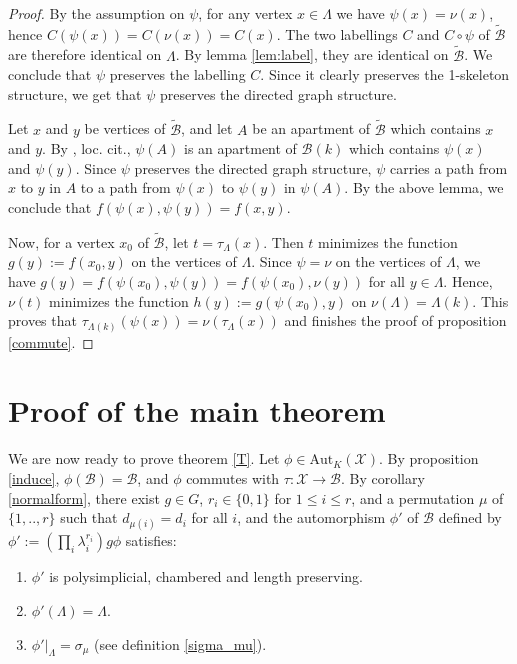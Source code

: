 \documentclass{amsart}
\theoremstyle{theorem}
\theoremstyle{lemma}
\theoremstyle{prop}
\theoremstyle{definition}
\theoremstyle{corollary}
\theoremstyle{remark}
\newcommand{\B}{\mathcal{B}}
\newcommand{\X}{\mathcal{X}}
\newcommand{\Aut}{\text{Aut}}
\begin{document}
\begin{proof}
By the assumption on $\psi$, for any vertex $x\in \Lambda$ we have $\psi(x)=\nu(x)$, hence $C(\psi(x))=C(\nu(x))=C(x)$. The two labellings  $C$ and $C \circ \psi$ of $\tilde{\B}$ are therefore identical on $\Lambda$. By lemma \ref{lem:label}, they are identical on $\tilde{\B}$. We conclude that $\psi$ preserves the labelling $C$. Since it clearly preserves the 1-skeleton structure, we get that $\psi$ preserves the directed graph structure.  

Let $x$ and $y$ be vertices of $\tilde{\B}$, and let $A$ be an apartment of $\tilde{\B}$ which contains $x$ and $y$. By \cite{brt}, loc. cit., $\psi(A)$ is an apartment of $\B(k)$ which contains $\psi(x)$ and $\psi(y)$. Since $\psi$ preserves the directed graph structure, $\psi$ carries a path from $x$ to $y$ in $A$ to a path from $\psi(x)$ to $\psi(y)$ in $\psi(A)$. By the above lemma, we conclude that $f(\psi(x),\psi(y))=f(x,y)$.

Now, for a vertex $x_0$ of $\tilde{\B}$, let $t=\tau_\Lambda(x)$. Then $t$ minimizes the function $g(y):=f(x_0,y)$ on the vertices of $\Lambda$. Since $\psi=\nu$ on the vertices of $\Lambda$, we have $g(y)=f(\psi(x_0),\psi(y))=f(\psi(x_0),\nu(y))$ for all $y \in \Lambda$. Hence, $\nu(t)$ minimizes the function $h(y):=g(\psi(x_0),y)$ on $\nu(\Lambda)=\Lambda(k)$. This proves that $\tau_{\Lambda(k)}(\psi(x))=\nu(\tau_\Lambda(x))$ and finishes the proof of proposition \ref{commute}. \end{proof}


\section{Proof of the main theorem}

We are now ready to prove theorem \ref{T}. Let $\phi \in \Aut_K(\X)$. By proposition \ref{induce}, $\phi(\B)=\B$, and $\phi$ commutes with $\tau:\X \rightarrow \B$. By corollary \ref{normalform}, there exist $g\in G$, $r_i \in \{0,1\}$ for $1\leq i \leq r$, and a permutation $\mu$ of $\{1,..,r\}$ such that $d_{\mu(i)}=d_i$ for all $i$, and the automorphism $\phi'$ of $\B$ defined by $\phi':=(\prod_i \lambda_i ^ {r_i}) g \phi$ satisfies:
\begin{enumerate}
\item
$\phi'$ is polysimplicial, chambered and length preserving.
\item
$\phi'(\Lambda)=\Lambda$.
\item
$\phi'|_\Lambda = \sigma_\mu$ (see definition \ref{sigma_mu}).
\end{enumerate}
\end{document}
